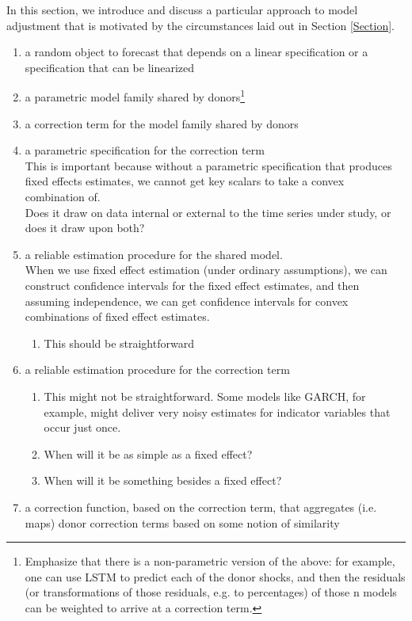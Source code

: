 \documentclass[11pt]{article}
\theoremstyle{definition}
\begin{document}
In this section, we introduce and discuss a particular approach to model adjustment that is motivated by the circumstances laid out in Section \ref{Section}.
\begin{enumerate}
  \item a random object to forecast that depends on a linear specification or a specification that can be linearized
  \item a parametric model family shared by donors\footnote{Emphasize that there is a non-parametric version of the above: for example, one can use LSTM to predict each of the donor shocks, and then the residuals (or transformations of those residuals, e.g. to percentages) of those n models can be weighted to arrive at a correction term.}
  \item a correction term for the model family shared by donors
  \item a parametric specification for the correction term\\
  
This is important because without a parametric specification that produces fixed effects estimates, we cannot get key scalars to take a convex combination of.\\

Does it draw on data internal or external to the time series under study, or does it draw upon both?

  \item a reliable estimation procedure for the shared model. \\
  
  When we use fixed effect estimation (under ordinary assumptions), we can construct confidence intervals for the fixed effect estimates, and then assuming independence, we can get confidence intervals for convex combinations of fixed effect estimates.
  

  \begin{enumerate}
  \item This should be straightforward
  \end{enumerate}
  \item a reliable estimation procedure for the correction term 
  \begin{enumerate}
    \item This might not be straightforward.  Some models like GARCH, for example, might deliver very noisy estimates for indicator variables that occur just once.
    \item When will it be as simple as a fixed effect?
    \item When will it be something besides a fixed effect?
    \end{enumerate}
  \item a correction function, based on the correction term, that aggregates (i.e. maps) donor correction terms based on some notion of similarity
\end{enumerate}
\end{document}
